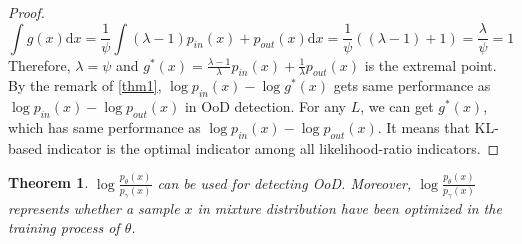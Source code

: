 \documentclass[a3paper]{article}
\newtheorem{theorem}{Theorem}
\newtheorem*{proof}{\it{Proof.}\rm}
\newcommand{\dd}{\mathrm{d}}
\newcommand{\pin}{p_{in}}
\newcommand{\pout}{p_{out}}
\begin{document}
\begin{proof}
	\begin{equation*}
		\int g(x) \dd x = \frac{1}{\psi} \int (\lambda - 1) \pin(x) + \pout(x) \dd x = \frac{1}{\psi} ((\lambda - 1) + 1) = \frac{\lambda}{\psi} = 1
	\end{equation*}
	Therefore, $\lambda = \psi$ and $g^*(x) = \frac{\lambda - 1}{\lambda} \pin(x) + \frac{1}{\lambda} \pout(x)$ is the extremal point.
	By the remark of \cref{thm1}, $\log \pin(x) - \log g^*(x)$ gets same performance as $\log \pin(x) - \log \pout(x)$ in OoD detection. 
	For any $L$, we can get $g^*(x)$, which has same performance as $\log \pin(x) - \log \pout(x)$. It means that KL-based indicator is the optimal indicator among all likelihood-ratio indicators. 
\end{proof}


\begin{theorem}\label{thm5}
	$\log \frac{p_\theta(x)}{p_\gamma(x)}$ can be used for detecting OoD. Moreover, $\log \frac{p_\theta(x)}{p_\gamma(x)}$ represents whether a sample $x$ in mixture distribution have been optimized in the training process of $\theta$.
\end{theorem}
\end{document}

